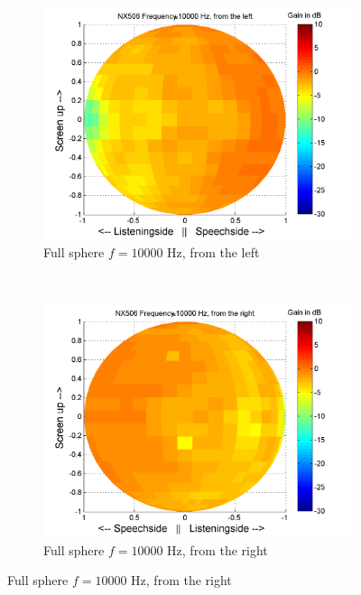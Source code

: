 \begin{figure}[t!]
        \begin{subfigure}[t]{0.5\textwidth}
			    \caption{Full sphere $f=10000$ Hz, from the left}
			    \label{fig:res_NX506_pluis_sphere_left}
                \centering
    			\includegraphics[height=0.28\textheight]{afbeeldingen/plots/results/NX506_10000_left.png}
        \end{subfigure}~
        \begin{subfigure}[t]{0.5\textwidth}
			    \caption{Full sphere $f=10000$ Hz, from the right}
			    \label{fig:res_NX506_pluis_sphere_right}
                \centering
    			\includegraphics[height=0.28\textheight]{afbeeldingen/plots/results/NX506_10000_right.png}
        \end{subfigure}
\end{figure}

